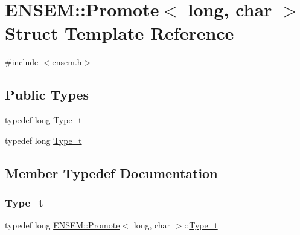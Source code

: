 \hypertarget{structENSEM_1_1Promote_3_01long_00_01char_01_4}{}\section{E\+N\+S\+EM\+:\+:Promote$<$ long, char $>$ Struct Template Reference}
\label{structENSEM_1_1Promote_3_01long_00_01char_01_4}


{\ttfamily \#include $<$ensem.\+h$>$}

\subsection*{Public Types}
\begin{DoxyCompactItemize}
\item 
typedef long \mbox{\hyperlink{structENSEM_1_1Promote_3_01long_00_01char_01_4_a375f85fa724594195cd72e89a7f3a20c}{Type\+\_\+t}}
\item 
typedef long \mbox{\hyperlink{structENSEM_1_1Promote_3_01long_00_01char_01_4_a375f85fa724594195cd72e89a7f3a20c}{Type\+\_\+t}}
\end{DoxyCompactItemize}


\subsection{Member Typedef Documentation}
\mbox{\label{structENSEM_1_1Promote_3_01long_00_01char_01_4_a375f85fa724594195cd72e89a7f3a20c}} 
\subsubsection{\texorpdfstring{Type\_t}{Type\_t}\hspace{0.1cm}{\footnotesize\ttfamily [1/2]}}
{\footnotesize\ttfamily typedef long \mbox{\hyperlink{structENSEM_1_1Promote}{E\+N\+S\+E\+M\+::\+Promote}}$<$ long, char $>$\+::\mbox{\hyperlink{structENSEM_1_1Promote_3_01long_00_01char_01_4_a375f85fa724594195cd72e89a7f3a20c}{Type\+\_\+t}}}

\mbox{\label{structENSEM_1_1Promote_3_01long_00_01char_01_4_a375f85fa724594195cd72e89a7f3a20c}} 
